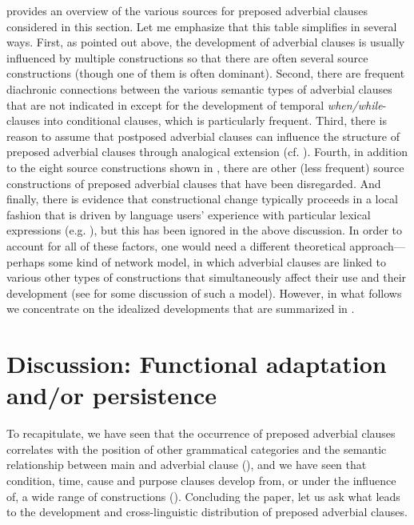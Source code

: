 \documentclass[output=paper]{langsci/langscibook}
\begin{document}
 provides an overview of the various sources for preposed adverbial clauses considered in this section. Let me emphasize that this table simplifies in several ways. First, as pointed out above, the development of adverbial clauses is usually influenced by multiple constructions so that there are often several source constructions (though one of them is often dominant). Second, there are frequent diachronic connections between the various semantic types of adverbial clauses that are not indicated in  except for the development of temporal \textit{when/while}-clauses into conditional clauses, which is particularly frequent. Third, there is reason to assume that postposed adverbial clauses can influence the structure of preposed adverbial clauses through analogical extension (cf. \citealt{Traugott1985}). Fourth, in addition to the eight source constructions shown in , there are other (less frequent) source constructions of preposed adverbial clauses that have been disregarded. And finally, there is evidence that constructional change typically proceeds in a local fashion that is driven by language users’ experience with particular lexical expressions (e.g. \citealt{Givón1991}), but this has been ignored in the above discussion. In order to account for all of these factors, one would need a different theoretical approach—perhaps some kind of network model, in which adverbial clauses are linked to various other types of constructions that simultaneously affect their use and their development (see \citealt{Diessel2015} for some discussion of such a model). However, in what follows we concentrate on the idealized developments that are summarized in .

\section{Discussion: Functional adaptation and/or persistence}
\label{sec:diessel:4}

To recapitulate, we have seen that the occurrence of preposed adverbial clauses correlates with the position of other grammatical categories and the semantic relationship between main and adverbial clause (), and we have seen that condition, time, cause and purpose clauses develop from, or under the influence of, a wide range of constructions (). Concluding the paper, let us ask what leads to the development and cross-linguistic distribution of preposed adverbial clauses.
\end{document}
